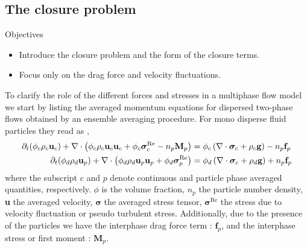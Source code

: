 \subsection{The closure problem}
Objectives
\begin{itemize}
    \item Introduce the closure problem and the form of the closure terms. 
    \item Focus only on the drag force and velocity fluctuations. 
\end{itemize}
To clarify the role of the different forces and stresses in a multiphase flow model we start by listing the averaged momentum equations for dispersed two-phase flows obtained by an ensemble averaging procedure.
For mono disperse fluid particles they read as \citep{zhang1997momentum,jackson1997locally},
\begin{align}
    \partial_t (\phi_c\rho_c \textbf{u}_c)
    + \mathbf{\nabla} \cdot \left(\phi_c\rho_c \textbf{u}_c\textbf{u}_c + \phi_c  \bm{\sigma}_c^{\text{Re}} - n_p\textbf{M}_p \right)
    &= \phi_c 
    \left(\mathbf{\nabla} \cdot \bm{\sigma}_c
    + \rho_c \textbf{g}\right)
    - n_p \textbf{f}_p 
    \label{eq:dt_uc}
    \\
    \partial_t (\phi_d\rho_d \textbf{u}_p)
    + \mathbf{\nabla} \cdot \left(\phi_d\rho_d \textbf{u}_p\textbf{u}_p+ \phi_d \bm{\sigma}_p^{\text{Re}}\right)
    &= 
    \phi_d \left(\mathbf{\nabla} \cdot \bm{\sigma}_c
    + \rho_d \textbf{g}\right)
    + n_p \textbf{f}_p 
    \label{eq:dy_up}
\end{align}
where the subscript $c$ and $p$ denote continuous and particle phase averaged quantities, respectively.
$\phi$ is the volume fraction, $n_p$ the particle number density, \textbf{u} the averaged velocity, $\bm{\sigma}$ the averaged stress tensor, $\bm{\sigma}^{\text{Re}}$ the stress due to velocity fluctuation or pseudo turbulent stress.
Additionally, due to the presence of the particles we have the interphase drag force term : $\textbf{f}_p$, and the interphase stress or first moment : $\textbf{M}_p$. 



